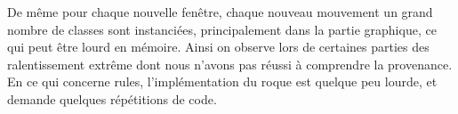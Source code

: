 \documentclass[a4paper]{article}
\begin{document}
De même pour chaque nouvelle fenêtre, chaque nouveau mouvement un grand nombre de classes sont instanciées, principalement dans la partie graphique, ce qui peut être lourd en mémoire. Ainsi on observe lors de certaines parties des ralentissement extrême dont nous n'avons pas réussi à comprendre la provenance. \\ 

En ce qui concerne rules, l'implémentation du roque est quelque peu lourde, et demande quelques répétitions de code. \\
\end{document}
